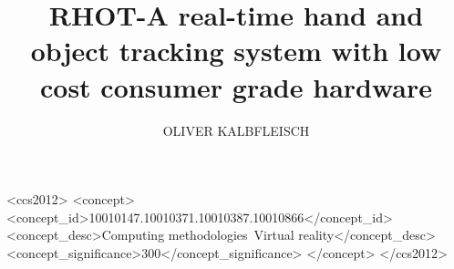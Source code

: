 \documentclass{acmtog} %
\begin{document}
\title{RHOT-A real-time hand and object tracking
system with low cost consumer grade
hardware} %

\author{OLIVER KALBFLEISCH
}




%
%
\begin{CCSXML}
<ccs2012>
<concept>
<concept_id>10010147.10010371.10010387.10010866</concept_id>
<concept_desc>Computing methodologies~Virtual reality</concept_desc>
<concept_significance>300</concept_significance>
</concept>
</ccs2012>
\end{CCSXML}
%
%



\maketitle

\end{document}
